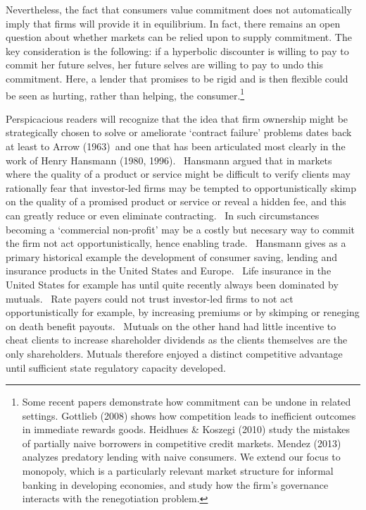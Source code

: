 \documentclass[11pt]{article}%
\begin{document}
Nevertheless, the fact that consumers value commitment does not automatically
imply that firms will provide it in equilibrium. In fact, there remains an
open question about whether markets can be relied upon to supply commitment.
The key consideration is the following: if a hyperbolic discounter is willing
to pay to commit her future selves, her future selves are willing to pay to
undo this commitment. Here, a lender that promises to be rigid and is then
flexible could be seen as hurting, rather than helping, the
consumer.\footnote{Some recent papers demonstrate how commitment can be undone
in related settings. Gottlieb (2008) shows how competition leads to
inefficient outcomes in immediate rewards goods. Heidhues \& Koszegi (2010)
study the mistakes of partially naive borrowers in competitive credit markets.
Mendez (2013) analyzes predatory lending with naive consumers. We extend our
focus to monopoly, which is a particularly relevant market structure for
informal banking in developing economies, and study how the firm's governance
interacts with the renegotiation problem.}

Perspicacious readers will recognize that the idea that firm ownership might
be strategically chosen to solve or ameliorate `contract failure' problems
dates back at least to Arrow (1963)\ and one that has been articulated most
clearly in the work of Henry Hansmann (1980, 1996). \ Hansmann argued that in
markets where the quality of a product or service might be difficult to verify
clients may rationally fear that investor-led firms may be tempted to
opportunistically skimp on the quality of a promised product or service or
reveal a hidden fee, and this can greatly reduce or even eliminate
contracting. \ In such circumstances becoming a `commercial non-profit' may be
a costly but necesary way to commit the firm not act opportunistically, hence
enabling trade. \ Hansmann gives as a primary historical example the
development of consumer saving, lending and insurance products in the United
States and Europe. \ Life insurance in the United States for example has until
quite recently always been dominated by mutuals. \ Rate payers could not trust
investor-led firms to not act opportunistically for example, by increasing
premiums or by skimping or reneging on death benefit payouts. \ Mutuals on the
other hand had little incentive to cheat clients to increase shareholder
dividends as the clients themselves are the only shareholders. Mutuals
therefore enjoyed a distinct competitive advantage until sufficient state
regulatory capacity developed.
\end{document}
